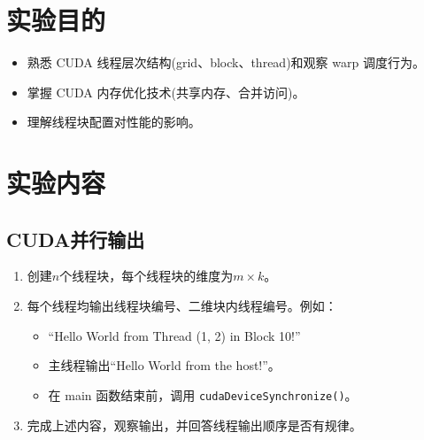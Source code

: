 \documentclass{SYSUReport}
\date{2026年6月10日}
\begin{document}
\cover
\thispagestyle{empty} %
\clearpage



\section{实验目的}
\begin{itemize}
   \item 熟悉 CUDA 线程层次结构(grid、block、thread)和观察 warp 调度行为。
    \item 掌握 CUDA 内存优化技术(共享内存、合并访问)。
    \item 理解线程块配置对性能的影响。
\end{itemize}
\section{实验内容}
\subsection{CUDA并行输出}
\begin{enumerate}
    \item 创建$n$个线程块，每个线程块的维度为$m\times k$。
    \item 每个线程均输出线程块编号、二维块内线程编号。例如：
    \begin{itemize}
        \item ``Hello World from Thread (1, 2) in Block 10!''
         \item 主线程输出``Hello World from the host!''。
        \item 在 main 函数结束前，调用 \texttt{cudaDeviceSynchronize()}。
    \end{itemize}
    \item 完成上述内容，观察输出，并回答线程输出顺序是否有规律。
\end{enumerate}
\end{document}

